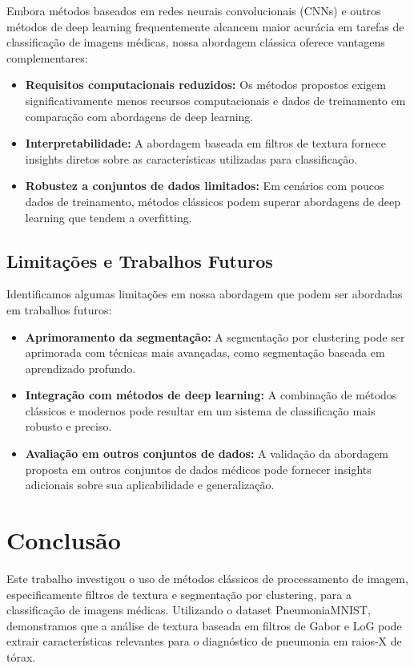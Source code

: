\documentclass[sigconf,nonacm]{acmart}
\begin{document}
Embora métodos baseados em redes neurais convolucionais (CNNs) e outros métodos de deep learning frequentemente alcancem maior acurácia em tarefas de classificação de imagens médicas, nossa abordagem clássica oferece vantagens complementares:

\begin{itemize}
  \item \textbf{Requisitos computacionais reduzidos:} Os métodos propostos exigem significativamente menos recursos computacionais e dados de treinamento em comparação com abordagens de deep learning.
  \item \textbf{Interpretabilidade:} A abordagem baseada em filtros de textura fornece insights diretos sobre as características utilizadas para classificação.
  \item \textbf{Robustez a conjuntos de dados limitados:} Em cenários com poucos dados de treinamento, métodos clássicos podem superar abordagens de deep learning que tendem a overfitting.
\end{itemize}

\subsection{Limitações e Trabalhos Futuros}

Identificamos algumas limitações em nossa abordagem que podem ser abordadas em trabalhos futuros:
\begin{itemize}
  \item \textbf{Aprimoramento da segmentação:} A segmentação por clustering pode ser aprimorada com técnicas mais avançadas, como segmentação baseada em aprendizado profundo.
  \item \textbf{Integração com métodos de deep learning:} A combinação de métodos clássicos e modernos pode resultar em um sistema de classificação mais robusto e preciso.
  \item \textbf{Avaliação em outros conjuntos de dados:} A validação da abordagem proposta em outros conjuntos de dados médicos pode fornecer insights adicionais sobre sua aplicabilidade e generalização.
\end{itemize}

\section{Conclusão}

Este trabalho investigou o uso de métodos clássicos de processamento de imagem, especificamente filtros de textura e segmentação por clustering, para a classificação de imagens médicas. Utilizando o dataset PneumoniaMNIST, demonstramos que a análise de textura baseada em filtros de Gabor e LoG pode extrair características relevantes para o diagnóstico de pneumonia em raios-X de tórax.
\end{document}
